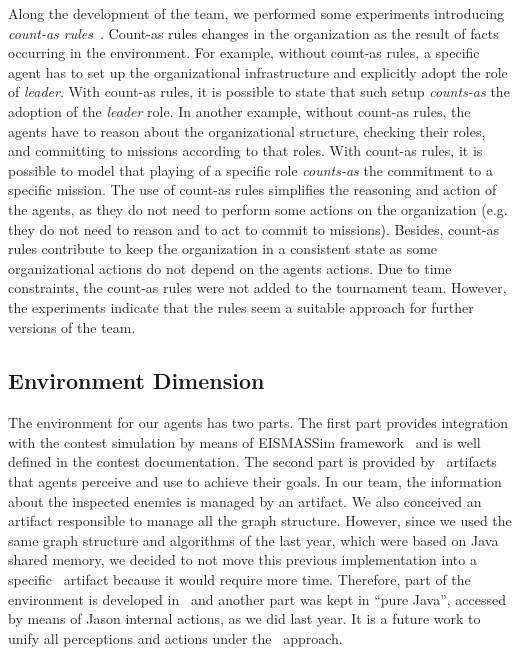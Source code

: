 Along the development of the team, we performed some experiments introducing \emph{count-as rules}~\cite{brito:2012}. Count-as rules changes in the organization as the result of facts occurring in the environment. For example, without count-as rules, a specific agent has to set up the organizational infrastructure and explicitly adopt the role of \emph{leader}. With count-as rules, it is possible to state that such setup \emph{counts-as} the adoption of the \emph{leader} role. In another example, without count-as rules, the agents have to reason about the organizational structure, checking their roles, and committing to missions according to that roles. With count-as rules, it is possible to model that playing of a specific role \emph{counts-as} the commitment to a specific mission. The use of count-as rules simplifies the reasoning and action of the agents, as they do not need to perform some actions on the organization (e.g. they do not need to reason and to act to commit to missions). Besides, count-as rules contribute to keep the organization in a consistent state as some organizational actions do not depend on the agents actions. Due to time constraints, the count-as rules were not added to the tournament team. However, the experiments indicate that the rules seem a suitable approach for further versions of the team.

\subsection{Environment Dimension}\label{sec:env}

The environment for our agents has two parts. The first part provides integration with the contest simulation by means of EISMASSim framework~\cite{behrens:2011} and is well defined in the contest documentation. The second part is provided by \jacamo\ artifacts that agents perceive and use to achieve their goals. In our team, the information about the inspected enemies is managed by an artifact.  We also conceived an artifact responsible to manage all the graph structure. However, since we used the same graph structure and algorithms of the last year, which were based on Java shared memory, we decided to not move this previous implementation into a specific \cartago\ artifact because it would require more time. Therefore, part of the environment is developed in \cartago\ and another part was kept in ``pure Java'', accessed by means of Jason internal actions, as we did last year. It is a future work to unify all perceptions and actions under the \cartago\ approach.


